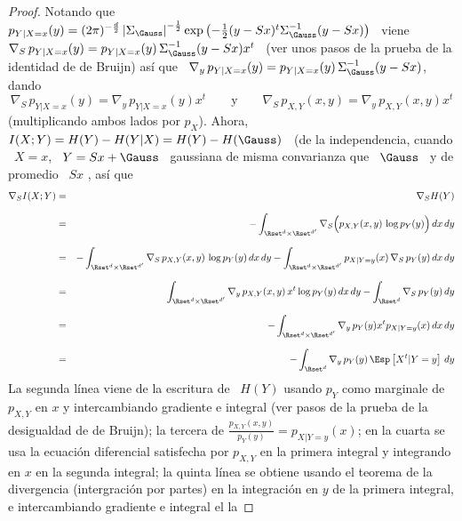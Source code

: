 %
\begin{proof}
  Notando  que \ $p_{Y|X=x}  (y) =  (2 \pi)^{-\frac{d}{2}}  \left| \Sigma_\Gauss
  \right|^{-\frac12}  \exp\left( -\frac12  (y-S  x)^t \Sigma_\Gauss^{-1}  (y-Sx)
  \right)$   \   viene  \   $\nabla_S   \,   p_{Y|X=x}(y)   =  p_{Y|X=x}(y)   \,
  \Sigma_\Gauss^{-1}  (y -  S x)  x^t$ \  (ver  unos pasos  de la  prueba de  la
  identidad de de  Bruijn) as\'i que \ $\nabla_y  \, p_{Y|X=x}(y) = p_{Y|X=x}(y)
  \, \Sigma_\Gauss^{-1} (y - S x)$, dando
  \[
  \nabla_S \, p_{Y|X=x}(y) = \nabla_y \, p_{Y|X=x}(y) x^t \qquad \mbox{y} \qquad
  \nabla_S \, p_{X,Y}(x,y) = \nabla_y \, p_{X,Y}(x,y) x^t
  \]
  (multiplicando ambos lados por $p_X$). Ahora, \ $I(X;Y) = H(Y) - H(Y|X) = H(Y)
  - H(\Gauss)$ \ (de la independencia, cuando \ $X  = x$, \ $Y = S x + \Gauss$ \
  gaussiana  de misma  convarianza  que  \ $\Gauss$  \  y de  promedio  \ $S  x$
  \modif{(ver  ejemplo~\ref{Ej:MP:SumaCond},  pagina~\pageref{Ej:MP:SumaCond})},
  as\'i que
  \begin{eqnarray*}
  \nabla_S I(X;Y) & = & \nabla_S H(Y)\\[2.5mm]
  & = & - \int_{\Rset^d \times \Rset^{d'}} \nabla_S \Big( p_{X,Y}(x,y) \, \log
  p_Y(y) \Big) \, dx \, dy\\[2.5mm]
  & = & - \int_{\Rset^d \times \Rset^{d'}} \nabla_S \, p_{X,Y}(x,y) \, \log p_Y(y) \,
  dx \, dy - \int_{\Rset^d \times \Rset^{d'}} p_{X|Y=y}(x) \, \nabla_S \, p_Y(y) \, dx \,
  dy\\[2.5mm]
  & = & \int_{\Rset^d \times \Rset^{d'}} \nabla_y \, p_{X,Y}(x,y) \, x^t \log p_Y(y)
  \, dx \, dy - \int_{\Rset^d} \nabla_S \, p_Y(y) \, dy\\[2.5mm]
  & = & - \int_{\Rset^d \times \Rset^{d'}} \nabla_y \, p_Y(y) x^t p_{X|Y=y}(x) \, dx
  \, dy\\[2.5mm]
  & = & - \int_{\Rset^d} \nabla_y \, p_Y(y) \, \Esp\left[X^t | Y = y \right] \, dy
  \end{eqnarray*}
  La  segunda l\'inea  viene  de la  escritura  de \  $H(Y)$  usando $p_Y$  como
  marginale de $p_{X,Y}$ en $x$ y intercambiando gradiente e integral (ver pasos
  de   la   prueba  de   la   desigualdad  de   de   Bruijn);   la  tercera   de
  $\frac{p_{X,Y}(x,y)}{p_Y(y)}  =   p_{X|Y=y}(x)$;  en  la  cuarta   se  usa  la
  ecuaci\'on  diferencial satisfecha  por  $p_{X,Y}$ en  la  primera integral  y
  integrando en $x$ en la segunda  integral; la quinta l\'inea se obtiene usando
  el teorema de  la divergencia (intergraci\'on por partes)  en la integraci\'on
  en $y$  de la primera  integral, e intercambiando  gradiente e integral  el la

\end{proof}
